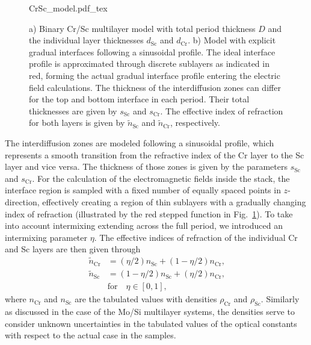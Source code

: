 \begin{figure}[htb]
    \def\svgwidth{\textwidth}
    {CrSc_model.pdf_tex}
    \caption[Binary and gradual Cr/Sc multilayer models.]{a) Binary Cr/Sc multilayer model with total period thickness $D$ and 
the individual layer thicknesses $d_\text{Sc}$ and $d_\text{Cr}$. b) Model with 
explicit gradual interfaces following a sinusoidal profile. The ideal interface 
profile is approximated through discrete sublayers as indicated in red, forming 
the actual gradual interface profile entering the electric field calculations. 
The thickness of the interdiffusion zones can differ for the top and bottom 
interface in each period. Their total thicknesses are given by $s_\text{Sc}$ 
and $s_\text{Cr}$. The effective index of refraction for both layers is given 
by $\tilde{n}_\text{Sc}$ and $\tilde{n}_\text{Cr}$, respectively.}
    \label{ch_spec:fig_CrScModel}
\end{figure}
The interdiffusion zones are modeled following a sinusoidal profile, which represents a smooth transition from the refractive index of the Cr layer to the Sc layer and vice versa. The thickness of those zones is given by the parameters $s_\text{Sc}$ and $s_\text{Cr}$. For the calculation of the electromagnetic fields inside the stack, the interface region is sampled with a fixed number of equally spaced points in $z$-direction, effectively creating a region of thin sublayers with a gradually changing index of refraction (illustrated by the red stepped function in Fig.~\ref{ch_spec:fig_CrScModel}). To take into account intermixing extending across the full period, we introduced an intermixing parameter $\eta$. The effective indices of refraction of the individual Cr and Sc layers are then given through
\begin{align}
\tilde{n}_\text{Cr} &=(\eta/2) n_\text{Sc} + (1-\eta/2) n_\text{Cr} \text{,} 
\nonumber\\
\tilde{n}_\text{Sc} &=(1-\eta/2) n_\text{Sc} + (\eta/2) n_\text{Cr} \text{,} 
\label{eqn:effective_n} \\
&\text{for} \quad \eta \in [0,1] \text{,}\nonumber
\end{align}
where $n_\text{Cr}$ and $n_\text{Sc}$ are the tabulated values \cite{henke_x-ray_1993} 
with densities $\rho_\text{Cr}$ and $\rho_\text{Sc}$. Similarly as discussed in the case of the Mo/Si multilayer systems, the densities serve to consider unknown uncertainties in the tabulated values of the optical constants with respect to the actual case in the samples.

